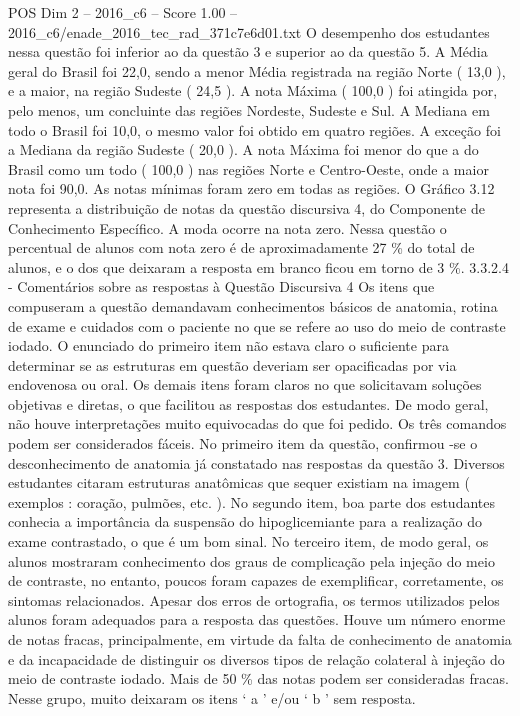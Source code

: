 \begin{textsample}{POS Dim 2 – 2016\_c6 – Score 1.00 – 2016\_c6/enade\_2016\_tec\_rad\_371c7e6d01.txt}
O desempenho dos estudantes nessa questão foi inferior ao da questão 3 e superior ao da questão 5.
A Média geral do Brasil foi 22,0, sendo a menor Média registrada na região Norte ( 13,0 ), e a maior, na região Sudeste ( 24,5 ).
A nota Máxima ( 100,0 ) foi atingida por, pelo menos, um concluinte das regiões Nordeste, Sudeste e Sul.
A Mediana em todo o Brasil foi 10,0, o mesmo valor foi obtido em quatro regiões.
A exceção foi a Mediana da região Sudeste ( 20,0 ).
A nota Máxima foi menor do que a do Brasil como um todo ( 100,0 ) nas regiões Norte e Centro-Oeste, onde a maior nota foi 90,0.
As notas mínimas foram zero em todas as regiões.
O Gráfico 3.12 representa a distribuição de notas da questão discursiva 4, do Componente de Conhecimento Específico.
A moda ocorre na nota zero.
Nessa questão o percentual de alunos com nota zero é de aproximadamente 27 \% do total de alunos, e o dos que deixaram a resposta em branco ficou em torno de 3 \%. 3.3.2.4 - Comentários sobre as respostas à Questão Discursiva 4 Os itens que compuseram a questão demandavam conhecimentos básicos de anatomia, rotina de exame e cuidados com o paciente no que se refere ao uso do meio de contraste iodado.
O enunciado do primeiro item não estava claro o suficiente para determinar se as estruturas em questão deveriam ser opacificadas por via endovenosa ou oral.
Os demais itens foram claros no que solicitavam soluções objetivas e diretas, o que facilitou as respostas dos estudantes.
De modo geral, não houve interpretações muito equivocadas do que foi pedido.
Os três comandos podem ser considerados fáceis.
No primeiro item da questão, confirmou -se o desconhecimento de anatomia já constatado nas respostas da questão 3.
Diversos estudantes citaram estruturas anatômicas que sequer existiam na imagem ( exemplos : coração, pulmões, etc. ).
No segundo item, boa parte dos estudantes conhecia a importância da suspensão do hipoglicemiante para a realização do exame contrastado, o que é um bom sinal.
No terceiro item, de modo geral, os alunos mostraram conhecimento dos graus de complicação pela injeção do meio de contraste, no entanto, poucos foram capazes de exemplificar, corretamente, os sintomas relacionados.
Apesar dos erros de ortografia, os termos utilizados pelos alunos foram adequados para a resposta das questões.
Houve um número enorme de notas fracas, principalmente, em virtude da falta de conhecimento de anatomia e da incapacidade de distinguir os diversos tipos de relação colateral à injeção do meio de contraste iodado.
Mais de 50 \% das notas podem ser consideradas fracas.
Nesse grupo, muito deixaram os itens ‘ a ’ e/ou ‘ b ’ sem resposta.

\end{textsample}
